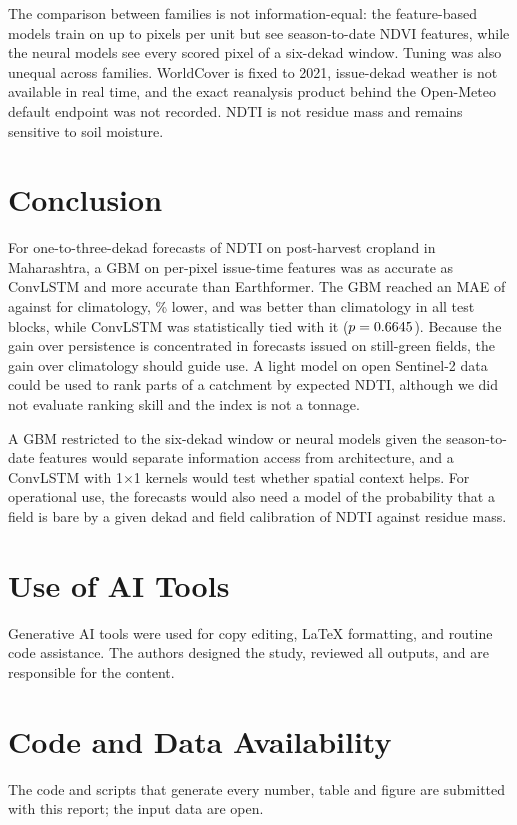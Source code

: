 \documentclass[journal]{IEEEtran}
\begin{document}
The comparison between families is not information-equal: the feature-based models train on up to \finxPerUnitPx{} pixels per unit but see season-to-date NDVI features, while the neural models see every scored pixel of a six-dekad window. Tuning was also unequal across families. WorldCover is fixed to 2021, issue-dekad weather is not available in real time, and the exact reanalysis product behind the Open-Meteo default endpoint was not recorded. NDTI is not residue mass and remains sensitive to soil moisture.

\section{Conclusion}
For one-to-three-dekad forecasts of NDTI on post-harvest cropland in Maharashtra, a GBM on per-pixel issue-time features was as accurate as ConvLSTM and more accurate than Earthformer. The GBM reached an MAE of \finGbmMAE{} against \finClimMAE{} for climatology, \finxGbmRelMAEVsClim\% lower, and was better than climatology in all \finNTestBlocks{} test blocks, while ConvLSTM was statistically tied with it ($p=0.6645$). Because the gain over persistence is concentrated in forecasts issued on still-green fields, the gain over climatology should guide use. A light model on open Sentinel-2 data could be used to rank parts of a catchment by expected NDTI, although we did not evaluate ranking skill and the index is not a tonnage.

A GBM restricted to the six-dekad window or neural models given the season-to-date features would separate information access from architecture, and a ConvLSTM with 1$\times$1 kernels would test whether spatial context helps. For operational use, the forecasts would also need a model of the probability that a field is bare by a given dekad and field calibration of NDTI against residue mass.

\section*{Use of AI Tools}
Generative AI tools were used for copy editing, LaTeX formatting, and routine code assistance. The authors designed the study, reviewed all outputs, and are responsible for the content.

\section*{Code and Data Availability}
The code and scripts that generate every number, table and figure are submitted with this report; the input data are open.
\end{document}
